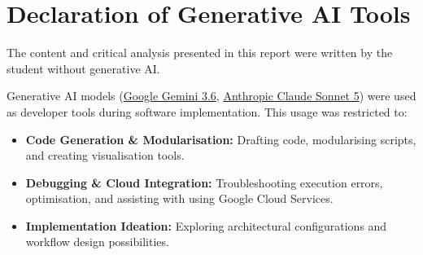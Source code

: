 \documentclass[a4paper, 11pt]{article} %
\begin{document}
\nopagebreak

\begin{abstract}
With climate change, high-resolution wildfire data is increasingly vital for risk assessment. This project investigates deep learning for downscaling GOES imagery ($2\,\text{km}$) to Landsat-resolution fire masks ($30\,\text{m}$), incorporating topographic and land cover covariates to address extreme class imbalance and $66\times$ resolution gap. We evaluate whether cascaded pipeline (GOES $\to$ VIIRS $375\,\text{m}$ $\to$ Landsat) outperforms direct pipeline (GOES $\to$ Landsat), comparing a Hybrid Attention U-Net (HAUNet) against an Autoencoder baseline. All configurations capture genuine fire signals, achieving up to $30\times$ higher AUPRC than prevalence-rate reference. Direct downscaling yields higher overall confidence ranking across both architectures (e.g. HAUNet AUPRC $0.0188$ direct vs. $0.0142$ cascaded), whereas cascading improves thresholded spatial overlap metrics, most prominently for HAUNet (IoU $0.0072$ vs. $0.0044$ direct): indicating no pipeline is uniformly superior. HAUNet outperforms Autoencoder across both pipelines, and feature ablations confirm elevation covariates contribute to performance. Results indicate the models are better suited for coarse regional risk flagging than precise fire-area prediction, with direct relevance to practical risk applications where under-prediction is costlier than over-prediction.
\end{abstract}

\section*{Declaration of Generative AI Tools}

The content and critical analysis presented in this report were written by the student without generative AI.

Generative AI models (\href{https://gemini.google.com/app}{Google Gemini 3.6}, \href{https://claude.ai/new}{Anthropic Claude Sonnet 5}) were used as developer tools during software implementation. This usage was restricted to:

\begin{itemize}
    \item \textbf{Code Generation \& Modularisation:} Drafting code, modularising scripts, and creating visualisation tools.
    \item \textbf{Debugging \& Cloud Integration:} Troubleshooting execution errors, optimisation, and assisting with using Google Cloud Services.
    \item \textbf{Implementation Ideation:} Exploring architectural configurations and workflow design possibilities.
\end{itemize}
\end{document}
